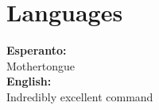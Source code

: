 \section{Languages}

\textbf{Esperanto:}\\
Mothertongue\\

\textbf{English:}\\
Indredibly excellent command\\

